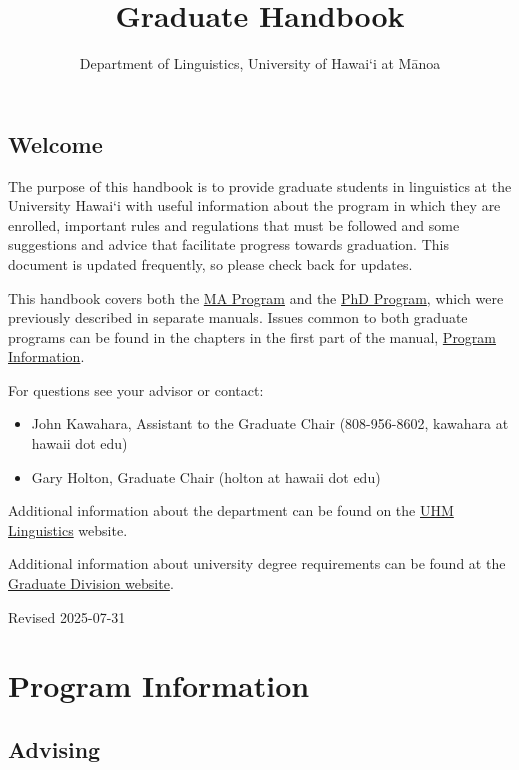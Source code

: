 \documentclass[
]{book}
\title{Graduate Handbook}
\author{Department of Linguistics, University of Hawai`i at Mānoa}
\date{}
\providecommand{\tightlist}{%
  \setlength{\itemsep}{0pt}\setlength{\parskip}{0pt}}
\begin{document}
\maketitle

{
\setcounter{tocdepth}{1}
\tableofcontents
}
\chapter*{Welcome}\label{welcome}

The purpose of this handbook is to provide graduate students in linguistics at the University Hawai`i with useful information about the program in which they are enrolled, important rules and regulations that must be followed and some suggestions and advice that facilitate progress towards graduation. This document is updated frequently, so please check back for updates.

This handbook covers both the \hyperref[maprogram]{MA Program} and the \hyperref[phdprogram]{PhD Program}, which were previously described in separate manuals. Issues common to both graduate programs can be found in the chapters in the first part of the manual, \hyperref[general]{Program Information}.

For questions see your advisor or contact:

\begin{itemize}
\tightlist
\item
  John Kawahara, Assistant to the Graduate Chair (808-956-8602, kawahara at hawaii dot edu)
\item
  Gary Holton, Graduate Chair (holton at hawaii dot edu)
\end{itemize}

Additional information about the department can be found on the \href{http://manoa.hawaii.edu/linguistics/}{UHM Linguistics} website.

Additional information about university degree requirements can be found at the \href{https://manoa.hawaii.edu/graduate/current-students/}{Graduate Division website}.

{Revised 2025-07-31}

\part*{Program Information}\label{part-program-information}

\chapter{Advising}\label{general}
\end{document}
